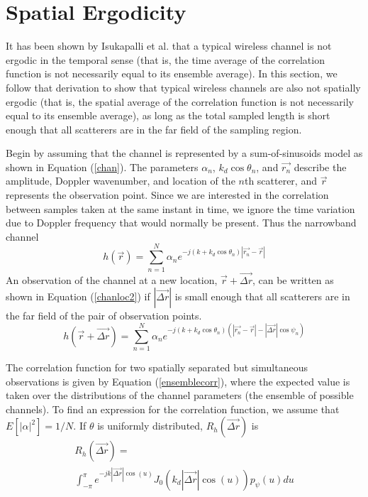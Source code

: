 \documentclass[conference]{ieeetran}
\begin{document}
\section{Spatial Ergodicity}
 It has been shown by Isukapalli et al. \cite{isukapalli2006} that a typical wireless channel is not ergodic in the temporal sense (that is, the time average of the correlation function is not necessarily equal to its ensemble average).  In this section, we follow that derivation to show that typical wireless channels are also not spatially ergodic (that is, the spatial average of the correlation function is not necessarily equal to its ensemble average), as long as the total sampled length is short enough that all scatterers are in the far field of the sampling region.

Begin by assuming that the channel is represented by a sum-of-sinusoids model as shown in Equation (\ref{chan}).  The parameters $\alpha_n$, $k_d\cos\theta_n$, and $\vec{r_n}$ describe the amplitude, Doppler wavenumber, and location of the $n$th scatterer, and $\vec{r}$ represents the observation point.  Since we are interested in the correlation between samples taken at the same instant in time, we ignore the time variation due to Doppler frequency that would normally be present. Thus the narrowband channel 
\begin{equation}\label{chan}
h(\vec{r})= \sum_{n=1}^N \alpha_n  e^{-j(k+k_d\cos\theta_n)\left|\vec{r_n} - \vec{r}\right|}
\end{equation}
An observation of the channel at a new location, $\vec{r}+\vec{\Delta r}$, can be written as shown in Equation (\ref{chanloc2}) if $|\vec{\Delta r}|$ is small enough that all scatterers are in the far field of the pair of observation points.
\begin{equation}\label{chanloc2}
h(\vec{r}+\vec{\Delta r}) = \sum_{n=1}^N \alpha_n  e^{-j(k+k_d\cos\theta_n)(\left|\vec{r_n}-\vec{r}\right|-|\vec{\Delta r}| \cos \psi_n)}
\end{equation}

The correlation function for two spatially separated but simultaneous observations is given by Equation (\ref{ensemblecorr}), where the expected value is taken over the distributions of the channel parameters (the ensemble of possible channels). To find an expression for the correlation function, we assume that $E[|\alpha|^2]=1/N$.  If $\theta$ is uniformly distributed, $R_h(\vec{\Delta r})$ is
\begin{multline}
R_h(\vec{\Delta r})=\\\int_{-\pi}^{\pi}e^{-j k |\vec{\Delta r}| \cos(u)} J_0(k_d |\vec{\Delta r}| \cos(u))p_{\psi}(u) du 
\end{multline}
\end{document}
